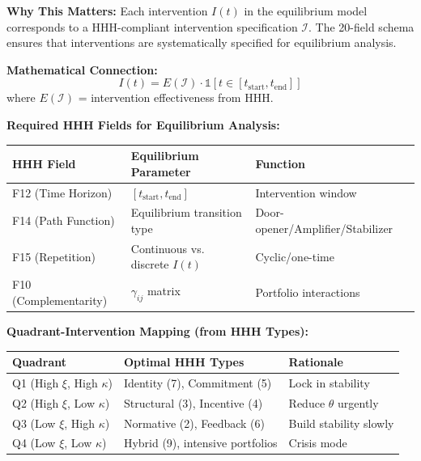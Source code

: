 \documentclass[11pt, a4paper]{article}
\begin{document}
\begin{tcolorbox}[colback=orange!5!white, colframe=orange!75!black,
    title=\textbf{Integration: Equilibria $\leftrightarrow$ HHH (Intervention Toolkit)}]

\textbf{Why This Matters:}
Each intervention $I(t)$ in the equilibrium model corresponds to a HHH-compliant
intervention specification $\mathcal{I}$. The 20-field schema ensures that
interventions are systematically specified for equilibrium analysis.

\textbf{Mathematical Connection:}
\begin{equation}
I(t) = E(\mathcal{I}) \cdot \mathbb{1}[t \in [t_{\text{start}}, t_{\text{end}}]]
\end{equation}
where $E(\mathcal{I})$ = intervention effectiveness from HHH.

\textbf{Required HHH Fields for Equilibrium Analysis:}
\begin{center}
\renewcommand{\arraystretch}{1.2}
\begin{tabular}{@{}lll@{}}
\toprule
\textbf{HHH Field} & \textbf{Equilibrium Parameter} & \textbf{Function} \\
\midrule
F12 (Time Horizon) & $[t_{\text{start}}, t_{\text{end}}]$ & Intervention window \\
F14 (Path Function) & Equilibrium transition type & Door-opener/Amplifier/Stabilizer \\
F15 (Repetition) & Continuous vs. discrete $I(t)$ & Cyclic/one-time \\
F10 (Complementarity) & $\gamma_{ij}$ matrix & Portfolio interactions \\
\bottomrule
\end{tabular}
\end{center}

\textbf{Quadrant-Intervention Mapping (from HHH Types):}
\begin{center}
\renewcommand{\arraystretch}{1.2}
\begin{tabular}{@{}lll@{}}
\toprule
\textbf{Quadrant} & \textbf{Optimal HHH Types} & \textbf{Rationale} \\
\midrule
Q1 (High $\xi$, High $\kappa$) & Identity (7), Commitment (5) & Lock in stability \\
Q2 (High $\xi$, Low $\kappa$) & Structural (3), Incentive (4) & Reduce $\theta$ urgently \\
Q3 (Low $\xi$, High $\kappa$) & Normative (2), Feedback (6) & Build stability slowly \\
Q4 (Low $\xi$, Low $\kappa$) & Hybrid (9), intensive portfolios & Crisis mode \\
\bottomrule
\end{tabular}
\end{center}


\end{tcolorbox}
\end{document}

